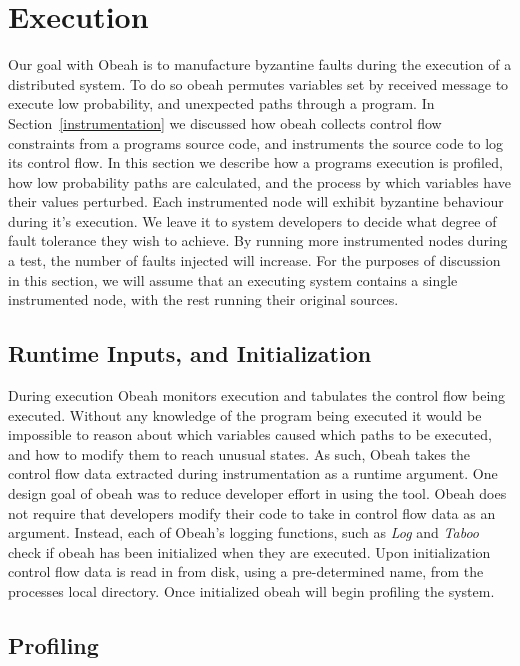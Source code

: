\section{Execution}
\label{exection}

Our goal with Obeah is to manufacture byzantine faults during the execution of
a distributed system. To do so obeah permutes variables set by received message
to execute low probability, and unexpected paths through a program. In
Section~\ref{instrumentation} we discussed how obeah collects control flow
constraints from a programs source code, and instruments the source code to log
its control flow. In this section we describe how a programs execution is
profiled, how low probability paths are calculated, and the process by which
variables have their values perturbed.  Each instrumented node will exhibit
byzantine behaviour during it's execution. We leave it to system developers to
decide what degree of fault tolerance they wish to achieve. By running more
instrumented nodes during a test, the number of faults injected will increase.
For the purposes of discussion in this section, we will assume that an
executing system contains a single instrumented node, with the rest running
their original sources.

\subsection{Runtime Inputs, and Initialization}

During execution Obeah monitors execution and tabulates the control flow being
executed. Without any knowledge of the program being executed it would be
impossible to reason about which variables caused which paths to be executed,
and how to modify them to reach unusual states. As such, Obeah takes the control
flow data extracted during instrumentation as a runtime argument. One design
goal of obeah was to reduce developer effort in using the tool. Obeah does not
require that developers modify their code to take in control flow data as an
argument. Instead, each of Obeah's logging functions, such as \emph{Log} and
\emph{Taboo} check if obeah has been initialized when they are executed. Upon
initialization control flow data is read in from disk, using a pre-determined
name, from the processes local directory. Once initialized obeah will begin
profiling the system.

\subsection{Profiling}

